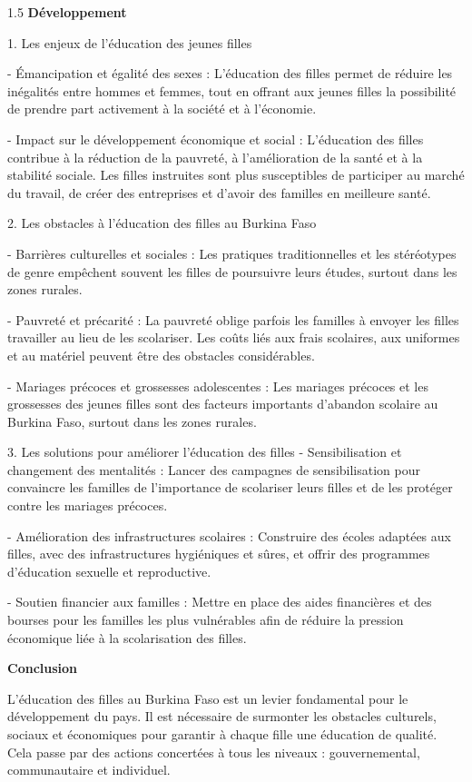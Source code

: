 \documentclass[12pt]{article}
\begin{document}
\begin{spacing}{1.5}
\textbf{Développement}

1. Les enjeux de l'éducation des jeunes filles
 
   - Émancipation et égalité des sexes : L'éducation des filles permet de réduire les inégalités entre hommes et femmes, tout en offrant aux jeunes filles la possibilité de prendre part activement à la société et à l'économie.
     
   - Impact sur le développement économique et social : L'éducation des filles contribue à la réduction de la pauvreté, à l'amélioration de la santé et à la stabilité sociale. Les filles instruites sont plus susceptibles de participer au marché du travail, de créer des entreprises et d'avoir des familles en meilleure santé.

2. Les obstacles à l'éducation des filles au Burkina Faso
 
   - Barrières culturelles et sociales : Les pratiques traditionnelles et les stéréotypes de genre empêchent souvent les filles de poursuivre leurs études, surtout dans les zones rurales. 
   
   - Pauvreté et précarité : La pauvreté oblige parfois les familles à envoyer les filles travailler au lieu de les scolariser. Les coûts liés aux frais scolaires, aux uniformes et au matériel peuvent être des obstacles considérables.
     
   - Mariages précoces et grossesses adolescentes : Les mariages précoces et les grossesses des jeunes filles sont des facteurs importants d'abandon scolaire au Burkina Faso, surtout dans les zones rurales.

3. Les solutions pour améliorer l'éducation des filles 
   - Sensibilisation et changement des mentalités : Lancer des campagnes de sensibilisation pour convaincre les familles de l'importance de scolariser leurs filles et de les protéger contre les mariages précoces. 
    
   - Amélioration des infrastructures scolaires : Construire des écoles adaptées aux filles, avec des infrastructures hygiéniques et sûres, et offrir des programmes d'éducation sexuelle et reproductive. 
    
   - Soutien financier aux familles : Mettre en place des aides financières et des bourses pour les familles les plus vulnérables afin de réduire la pression économique liée à la scolarisation des filles.

\textbf{Conclusion  }

L'éducation des filles au Burkina Faso est un levier fondamental pour le développement du pays. Il est nécessaire de surmonter les obstacles culturels, sociaux et économiques pour garantir à chaque fille une éducation de qualité. Cela passe par des actions concertées à tous les niveaux : gouvernemental, communautaire et individuel.




\end{spacing}
\end{document}

